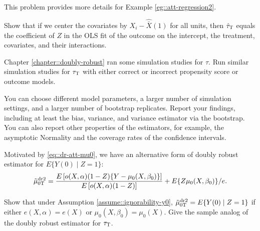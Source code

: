 \begin{HomeworkProblem}\label{exr:13-2}

 This problem provides more details for Example \ref{eg::att-regression2}.

Show that if we center the covariates by $X_i - \hat{\bar{X}}(1)$ for all units, then $\hat{\tau}_\textsc{T} $ equals the coefficient of $Z$ in the OLS fit of the outcome on the intercept, the treatment, covariates, and their interactions.



\end{HomeworkProblem}

\begin{HomeworkProblem}\label{exr:13-3}

Chapter \ref{chapter::doubly-robust} ran some simulation studies for $\tau$. Run similar simulation studies for $\tau_\textsc{T}$ with either correct or incorrect propensity score or outcome models.

You can choose different model parameters, a larger number of simulation settings, and a larger number of bootstrap replicates. Report your findings, including at least the bias, variance, and variance estimator via the bootstrap. You can also report other properties of the estimators, for example, the asymptotic Normality and the coverage rates of the confidence intervals.



\end{HomeworkProblem}

\begin{HomeworkProblem}\label{exr:13-4}

Motivated by \eqref{eq::dr-att-mu0}, we have an alternative form of doubly robust estimator for $ E\{ Y(0) \mid Z=1 \}  $:
\[
\tilde{\mu}_{0\textsc{T}}^\text{dr2} =
\frac{  E\left[ o(X,\alpha)   (1-Z) \{ Y - \mu_0(X, \beta_0) \}  \right] }{  E\left[ o(X,\alpha)   (1-Z) \right] }
  + E\{  Z  \mu_0(X, \beta_0) \} /e.
\]

Show that under Assumption \ref{assume::ignorability-y0}, $\tilde{\mu}_{0\textsc{T}}^\text{dr2}= E\{ Y(0) \mid Z=1 \}$ if either $e(X,\alpha)  = e(X)$ or $\mu_0(X, \beta_0) =  \mu_0(X)$.  Give the sample analog of the doubly robust estimator for $\tau_\textsc{T}$.





\end{HomeworkProblem}

